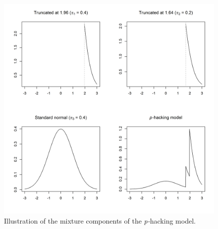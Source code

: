 \begin{figure}
\noindent \begin{centering}
\includegraphics[scale=0.5]{plots/p-hacking}
\par\end{centering}
\caption{\label{fig:p-hacking plots}Illustration of the mixture components
of the \emph{p-}hacking model.}

\end{figure}